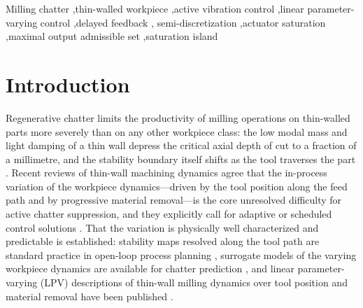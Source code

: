 \documentclass[preprint,12pt]{elsarticle}
\begin{document}
\begin{frontmatter}
\begin{keyword}
Milling chatter \sep thin-walled workpiece \sep active vibration control
\sep linear parameter-varying control \sep delayed feedback \sep
semi-discretization \sep actuator saturation \sep maximal output
admissible set \sep saturation island
\end{keyword}

\end{frontmatter}

\section{Introduction}
\label{sec:intro}

Regenerative chatter limits the productivity of milling operations on
thin-walled parts more severely than on any other workpiece class: the
low modal mass and light damping of a thin wall depress the critical
axial depth of cut to a fraction of a millimetre, and the stability
boundary itself shifts as the tool traverses the part
\cite{altintas1995analytical,altintas2012manufacturing}. Recent reviews
of thin-wall machining dynamics agree that the in-process variation of
the workpiece dynamics---driven by the tool position along the feed path
and by progressive material removal---is the core unresolved difficulty
for active chatter suppression, and they explicitly call for adaptive or
scheduled control solutions
\cite{sun2025review,yi2025review,qin2025chatter}. That the variation is
physically well characterized and predictable is established: stability
maps resolved along the tool path are standard practice in open-loop
process planning \cite{ahmadi2012stability}, surrogate models of the
varying workpiece dynamics are available for chatter prediction
\cite{yang2022gaussian}, and linear parameter-varying (LPV) descriptions
of thin-wall milling dynamics over tool position and material removal
have been published \cite{maslo2020improving}.
\end{document}
